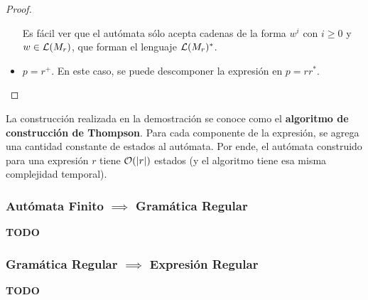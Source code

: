 \begin{proof}
\begin{itemize}
\begin{figure}[H]
              \end{figure}

              Es fácil ver que el autómata sólo acepta cadenas de la forma $w^i$ con $i \geq 0$ y $w \in \mathcal{L}(M_r)$, que forman el lenguaje $\mathcal{L}(M_r)^*$.

        \item $p = r^+$. En este caso, se puede descomponer la expresión en $p = rr^*$.
    \end{itemize}
\end{proof}

La construcción realizada en la demostración se conoce como el \textbf{algoritmo de construcción de Thompson}. Para cada componente de la expresión, se agrega una cantidad constante de estados al autómata. Por ende, el autómata construido para una expresión $r$ tiene $\mathcal{O}(|r|)$ estados (y el algoritmo tiene esa misma complejidad temporal).

\subsubsection{Autómata Finito $\implies$ Gramática Regular}

\textbf{TODO}

\subsubsection{Gramática Regular $\implies$ Expresión Regular}

\textbf{TODO}
